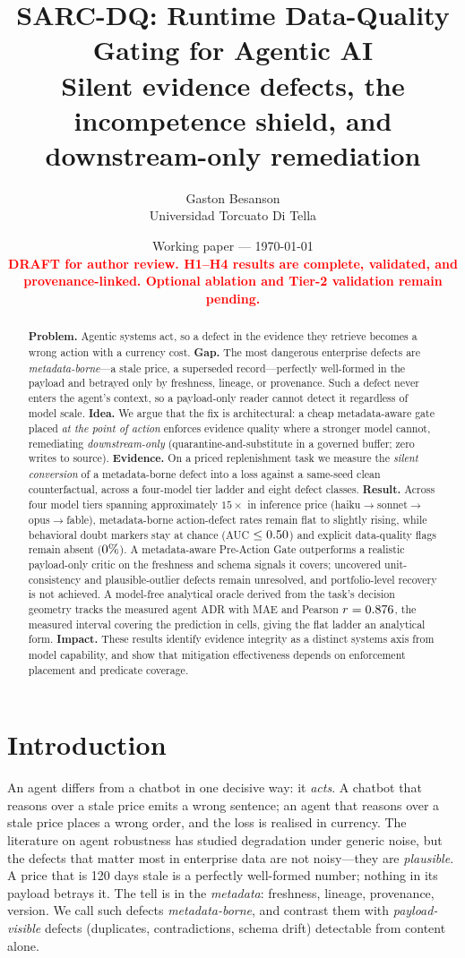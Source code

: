 \documentclass[11pt]{article}
\title{\textbf{SARC-DQ: Runtime Data-Quality Gating for Agentic AI}\\
  \large Silent evidence defects, the incompetence shield, and downstream-only remediation}
\author{Gaston Besanson\\ Universidad Torcuato Di Tella}
\date{Working paper --- \today \\[2pt]
  \textcolor{red}{\textbf{DRAFT for author review. H1--H4 results are complete, validated, and provenance-linked. Optional ablation and Tier-2 validation remain pending.}}}
\theoremstyle{plain}
\theoremstyle{definition}
\begin{document}
\maketitle

\begin{abstract}
\textbf{Problem.} Agentic systems act, so a defect in the evidence they retrieve becomes
a wrong action with a currency cost. \textbf{Gap.} The most dangerous enterprise defects
are \emph{metadata-borne}---a stale price, a superseded record---perfectly well-formed in
the payload and betrayed only by freshness, lineage, or provenance. Such a defect never
enters the agent's context, so a payload-only reader cannot detect it regardless of model
scale. \textbf{Idea.} We argue that the fix is architectural: a cheap metadata-aware gate
placed \emph{at the point of action} enforces evidence quality where a stronger model
cannot, remediating \emph{downstream-only} (quarantine-and-substitute in a governed buffer;
zero writes to source). \textbf{Evidence.} On a priced replenishment task we measure the
\emph{silent conversion} of a metadata-borne defect into a loss against a same-seed clean
counterfactual, across a four-model tier ladder and eight defect classes.
\textbf{Result.} Across four model tiers spanning approximately $15\times$ in inference
price (haiku$\to$sonnet$\to$opus$\to$fable), metadata-borne action-defect rates remain flat
to slightly rising, while behavioral doubt markers stay at chance (AUC
$\le0.50$) and explicit data-quality flags remain absent ($0\%$). A
metadata-aware Pre-Action Gate outperforms a realistic payload-only critic on the freshness
and schema signals it covers; uncovered unit-consistency and plausible-outlier defects
remain unresolved, and portfolio-level recovery is not achieved. A model-free analytical
oracle derived from the task's decision geometry tracks the measured agent ADR with MAE
\ConvMAE{} and Pearson $r=0.876$, the measured interval covering the prediction in
\ConvCICoverage{} cells, giving the flat ladder an analytical form. \textbf{Impact.} These
results identify evidence integrity as a distinct systems axis from model capability, and
show that mitigation effectiveness depends on enforcement placement and predicate coverage.
\end{abstract}

\section{Introduction}
An agent differs from a chatbot in one decisive way: it \emph{acts}. A chatbot that
reasons over a stale price emits a wrong sentence; an agent that reasons over a
stale price places a wrong order, and the loss is realised in currency. The
literature on agent robustness has studied degradation under generic noise, but the
defects that matter most in enterprise data are not noisy---they are
\emph{plausible}. A price that is 120 days stale is a perfectly well-formed number;
nothing in its payload betrays it. The tell is in the \emph{metadata}: freshness,
lineage, provenance, version. We call such defects \emph{metadata-borne}, and
contrast them with \emph{payload-visible} defects (duplicates, contradictions,
schema drift) detectable from content alone.
\end{document}
